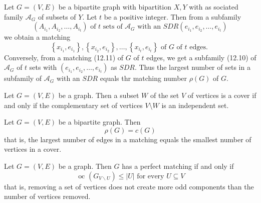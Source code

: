 \begin{theorem}
  \label{thm:12.5.1}
  Let $G=(V, E)$ be a bipartite graph with bipartition $X, Y$ with as sociated family $\mathcal{A}_G$ of subsets of $Y$. Let $t$ be a positive integer. Then from a subfamily
  \begin{equation}\label{12.10}
    \left(A_{i_1}, A_{i_2}, \ldots, A_{i_t}\right) \text { of } t \text { sets of } \mathcal{A}_G \text { with an } S D R\left(e_{i_1}, e_{i_2}, \ldots, e_{i_t}\right)
  \end{equation}
  we obtain a matching
  \begin{equation}\label{12.11}
    \left\{x_{i_1}, e_{i_1}\right\},\left\{x_{i_2}, e_{i_2}\right\}, \ldots,\left\{x_{i_t}, e_{i_t}\right\} \text { of } G \text { of } t \text { edges. }
  \end{equation}
  Conversely, from a matching (12.11) of $G$ of $t$ edges, we get a subfamily (12.10) of $\mathcal{A}_G$ of $t$ sets with $\left(e_{i_1}, e_{i_2}, \ldots, e_{i_t}\right)$ as $S D R$.
  Thus the largest number of sets in a subfamily of $\mathcal{A}_G$ with an $S D R$ equals thr matching number $\rho(G)$ of $G$.
\end{theorem}

\begin{theorem}
  \label{thm:12.5.2}
  Let $G = (V, E)$ be a graph. Then a subset $W$ of the set $V$ of vertices is a cover if and only if the complementary set of vertices $V \setminus W$ is an independent set.
\end{theorem}

\begin{theorem}
  \label{thm:12.5.3}
  Let $G=(V, E)$ be a bipartite graph. Then
  \begin{equation}\label{12.13}
    \rho(G)=c(G)
  \end{equation}
  that is, the largest number of edges in a matching equals the smallest number of vertices in a cover.
\end{theorem}

\begin{theorem}
  \label{thm:12.5.4}
  Let $G=(V, E)$ be a graph. Then $G$ has a perfect matching if and only if
  \begin{equation}\label{12.15}
    \text { oc }\left(G_{V \backslash U}\right) \leq|U| \text { for every } U \subseteq V
  \end{equation}
  that is, removing a set of vertices does not create more odd components than the number of vertices removed.
\end{theorem}

